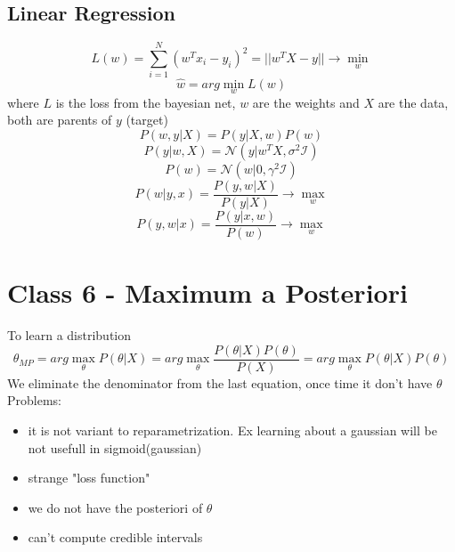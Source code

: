 \documentclass{article}
\begin{document}
\subsection{Linear Regression}
\begin{equation}
    L(w) = \sum_{i=1}^{N} (w^T x_i - y_i)^2 = ||w^T X - y|| \rightarrow \min_w
\end{equation}
\begin{equation}
    \hat{w} = arg \min_{w} L(w) 
\end{equation}
where $L$ is the loss from the bayesian net, $w$ are the weights and $X$ are the data, both are parents of $y$ (target)
\begin{equation}
    P(w, y|X) = P(y|X, w)P(w)
\end{equation}
\begin{equation}
    P(y|w, X) = \mathcal{N}(y|w^TX, \sigma^2\mathcal{I})
\end{equation}
\begin{equation}
    P(w) = \mathcal{N}(w|0, \gamma^2\mathcal{I}) 
\end{equation}
\begin{equation}
    P(w| y, x) = \frac{P(y, w|X)}{P(y|X)} \rightarrow \max_w
\end{equation}
\begin{equation}
    P(y, w|x) = \frac{P(y|x, w)}{P(w)} \rightarrow \max_w
\end{equation}

\section{Class 6 - Maximum a Posteriori}
To learn a distribution
\begin{equation}
    \theta_{MP} = arg \max_\theta P(\theta|X) = arg \max_\theta \frac{P(\theta|X)P(\theta)}{P(X)} = arg \max_\theta P(\theta|X)P(\theta)    
\end{equation}	
We eliminate the denominator from the last equation, once time it don't have $\theta$
Problems: \begin{itemize}
    \item it is not variant to reparametrization. Ex learning about a gaussian will be not usefull in sigmoid(gaussian)
	\item strange "loss function"
	\item we do not have the posteriori of $\theta$
	\item can't compute credible intervals
\end{itemize}		
			
\end{document}
